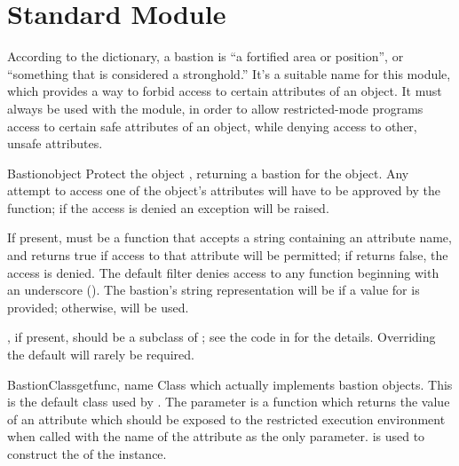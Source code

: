 \section{Standard Module }
\label{module-Bastion}


According to the dictionary, a bastion is ``a fortified area or
position'', or ``something that is considered a stronghold.''  It's a
suitable name for this module, which provides a way to forbid access
to certain attributes of an object.  It must always be used with the
 module, in order to allow restricted-mode programs access
to certain safe attributes of an object, while denying access to
other, unsafe attributes.


\begin{funcdesc}{Bastion}{object}
Protect the object , returning a bastion for the
object.  Any attempt to access one of the object's attributes will
have to be approved by the  function; if the access is
denied an  exception will be raised.

If present,  must be a function that accepts a string
containing an attribute name, and returns true if access to that
attribute will be permitted; if  returns false, the access
is denied.  The default filter denies access to any function beginning
with an underscore (\samp{_}).  The bastion's string representation
will be  if a value for
 is provided; otherwise,  will be
used.

, if present, should be a subclass of ; 
see the code in  for the details.  Overriding the
default  will rarely be required.
\end{funcdesc}


\begin{classdesc}{BastionClass}{getfunc, name}
Class which actually implements bastion objects.  This is the default
class used by .  The  parameter is a
function which returns the value of an attribute which should be
exposed to the restricted execution environment when called with the
name of the attribute as the only parameter.   is used to
construct the  of the  instance.
\end{classdesc}
